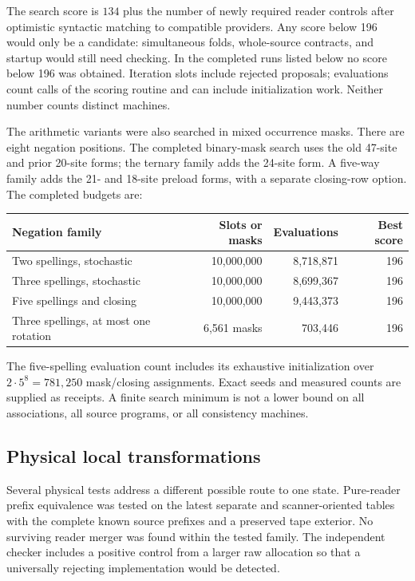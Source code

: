 \documentclass[11pt,a4paper]{article}
\begin{document}
The search score is $134$ plus the number of newly required reader controls
after optimistic syntactic matching to compatible providers. Any score
below 196 would only be a candidate: simultaneous folds, whole-source
contracts, and startup would still need checking. In the completed runs
listed below no score below 196 was obtained. Iteration slots include
rejected proposals; evaluations count calls of the scoring routine and
can include initialization work. Neither number counts distinct machines.



The arithmetic variants were also searched in mixed occurrence masks.
There are eight negation positions. The completed binary-mask search
uses the old 47-site and prior 20-site forms; the ternary family adds the
24-site form. A five-way family adds the 21- and 18-site preload forms,
with a separate closing-row option. The completed budgets are:
\begin{center}\small
\begin{tabular}{@{}lrrr@{}}
\toprule
Negation family & Slots or masks & Evaluations & Best score \\
\midrule
Two spellings, stochastic & 10,000,000 & 8,718,871 & 196 \\
Three spellings, stochastic & 10,000,000 & 8,699,367 & 196 \\
Five spellings and closing & 10,000,000 & 9,443,373 & 196 \\
Three spellings, at most one rotation & 6,561 masks & 703,446 & 196 \\
\bottomrule
\end{tabular}
\end{center}
The five-spelling evaluation count includes its exhaustive initialization
over $2\cdot5^8=781,250$ mask/closing assignments. Exact seeds and measured
counts are supplied as receipts. A finite search minimum is not a lower
bound on all associations, all source programs, or all consistency machines.

\subsection{Physical local transformations}

Several physical tests address a different possible route to one state.
Pure-reader prefix equivalence was tested on the latest separate and
scanner-oriented tables with the complete known source prefixes and a
preserved tape exterior. No surviving reader merger was found within the
tested family. The independent checker includes a positive control from
a larger raw allocation so that a universally rejecting implementation
would be detected.
\end{document}

